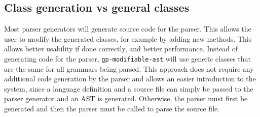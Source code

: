 
\subsection{Class generation vs general classes}

Most parser generators will generate source code for the parser.
This allows the user to modify the generated classes, for example by adding new methods. 
This allows better usability if done correctly, and better performance. 
Instead of generating code for the parser, \verb|gp-modifiable-ast| will use generic classes that are the same for all grammars being parsed. 
This approach does not require any additional code generation by the parser and allows an easier introduction to the system, since a language definition and a source file can simply be passed to the parser generator and an 
AST is generated. Otherwise, the parser must first be generated and then the parser must be called to parse the source file.
